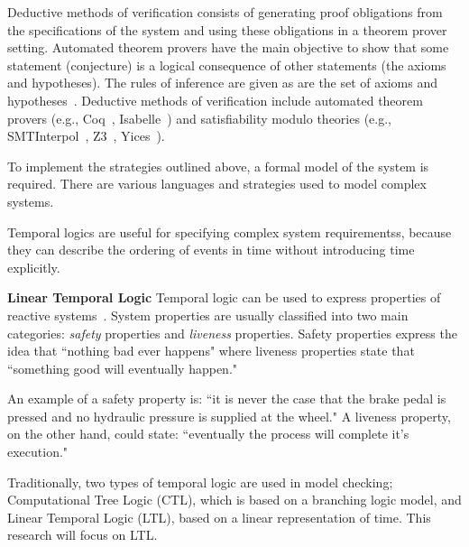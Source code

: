 Deductive methods of verification consists of generating proof obligations from the specifications of the system and using these obligations in a theorem prover setting. Automated theorem provers have the main objective to show that some statement (conjecture) is a logical consequence of other statements (the axioms and hypotheses). The rules of inference are given as are the set of axioms and hypotheses~\cite{d2008survey,fitting2012first}. Deductive methods of verification include automated theorem provers (e.g., Coq~\cite{coq}, Isabelle~\cite{isabelle}) and satisfiability modulo theories (e.g., SMTInterpol~\cite{smtInterpol}, Z3~\cite{z3}, Yices~\cite{yices}). 

To implement the strategies outlined above, a formal model of the system is required. There are various languages and strategies used to model complex systems. 















Temporal logics are useful for specifying complex system requirementss, because they can describe the ordering of events in time without introducing time explicitly. 


\textbf{Linear Temporal Logic}
Temporal logic can be used to express properties of reactive systems~\cite{Bozzano:2010:DSA:1951720}. System properties are usually classified into two main categories: {\em safety} properties and {\em liveness} properties. Safety properties express the idea that ``nothing bad ever happens" where liveness properties state that ``something good will eventually happen." 

An example of a safety property is: ``it is never the case that the brake pedal is pressed and no hydraulic pressure is supplied at the wheel." A liveness property, on the other hand, could state: ``eventually the process will complete it's execution." 

Traditionally, two types of temporal logic are used in model checking; Computational Tree Logic (CTL), which is based on a branching logic model, and Linear Temporal Logic (LTL), based on a linear representation of time. This research will focus on LTL. 

